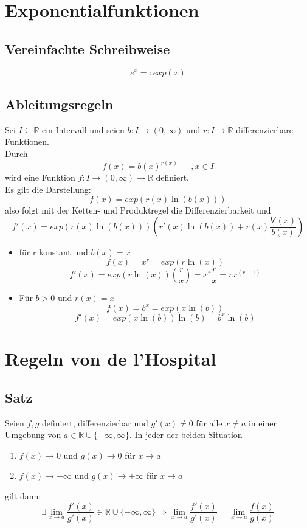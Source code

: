 \documentclass{scrartcl}
\begin{document}
	\section*{Exponentialfunktionen}
	\subsection*{Vereinfachte Schreibweise}

	\[
	e^x =: exp( x )
	\]

	\subsection*{Ableitungsregeln}

	Sei $I \subseteq \mathbb{R}$ ein Intervall und seien $b: I \to (0, \infty)$ und $r: I \to \mathbb{R}$ differenzierbare
	Funktionen.\\
	Durch \[
		f(x) = b(x)^{r(x)} ~~~~~~~, x \in I
	\] wird eine Funktion $f: I \to (0, \infty) \to \mathbb{R}$ definiert.\\
	Es gilt die Darstellung:
	\[
		f(x) = exp( r(x) \ln(b(x)))
	\]
	also folgt mit der Ketten- und Produktregel die Differenzierbarkeit und 
	\[
		f'(x) = exp( r(x) \ln(b(x)) )\left( r'(x) \ln(b(x)) + r(x) \frac{b'(x)}{b(x)} \right)
	\]
	
	\begin{itemize}
		\item
			für r konstant und $b(x) = x$\\
			\[
				f(x) = x^r = exp( r \ln(x) )
			\]
			\[
				f'(x) = exp( r \ln(x) ) \left( \frac{r}{x} \right) = x^r \frac{r}{x} = r x^{(r-1)}
			\]
		\item
			Für $b > 0$ und $r(x) = x$\\
			\[
				f(x) = b^x = exp( x \ln( b ) )
			\]
			\[
				f'(x) = exp( x \ln( b ) )  \ln(b) = b^x \ln(b)
			\]
			
	\end{itemize}
	
	\section*{Regeln von de l'Hospital}
	
	\subsection*{Satz}
	
	Seien $f,g$ definiert, differenzierbar und $g'(x) \neq 0$ für alle
	$x \neq a$ in einer Umgebung von $a \in \mathbb{R} \cup \{ -\infty, \infty\}$.
	In jeder der beiden Situation 
	\begin{enumerate}
		\item
			$f(x) \to 0$ und $g(x) \to 0$ für $x \to a$
		\item			
			$f(x) \to \pm \infty $ und $ g(x) \to \pm \infty$ für $x \to a$
	\end{enumerate}
	gilt dann:
	\[
		\exists \lim\limits_{x \to a} \frac{f'(x)}{g'(x)} \in \mathbb{R} \cup \{ -\infty, \infty\}
		\Rightarrow
		\lim\limits_{x \to a} \frac{f'(x)}{g'(x)} = \lim\limits_{x \to a} \frac{f(x)}{g(x)}
	\]
	
\end{document}
